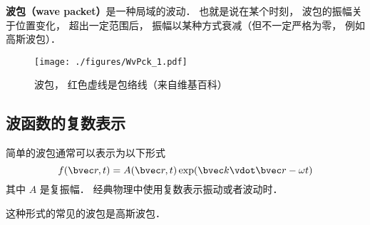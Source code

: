 

\textbf{波包（wave packet）}是一种局域的波动． 也就是说在某个时刻， 波包的振幅关于位置变化， 超出一定范围后， 振幅以某种方式衰减（但不一定严格为零， 例如高斯波包）． %

\begin{figure}[ht]
\centering
\texttt{[image: ./figures/WvPck\_1.pdf]}
\caption{波包， 红色虚线是包络线（来自维基百科）} \label{WvPck_fig1}
\end{figure}

\subsection{波函数的复数表示}
简单的波包通常可以表示为以下形式
\begin{equation}
f(\bvec r, t) = A(\bvec r, t) \exp(\bvec k \vdot \bvec r - \omega t)
\end{equation}
其中 $A$ 是复振幅． 经典物理中使用复数表示振动或者波动时．

这种形式的常见的波包是高斯波包．
